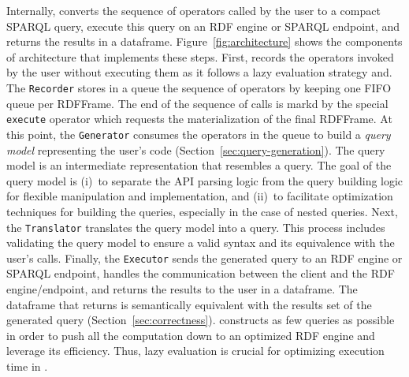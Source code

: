 Internally, \rdfframes  converts the sequence of operators called by the user to a compact SPARQL query, execute this query on an RDF engine or SPARQL endpoint, and returns the results in a dataframe. Figure~\ref{fig:architecture} shows the components of \rdfframes architecture that implements these steps. First, \rdfframes records the operators invoked by the user without executing them as it follows a lazy evaluation strategy and. The \texttt{Recorder} stores in a queue the sequence of operators by keeping one FIFO queue per RDFFrame. %
The end of the sequence of calls is markd by the special \rdfframes \texttt{execute} operator which requests the materialization of the final RDFFrame. 
At this point, the \texttt{Generator} consumes the operators in the queue to build a {\em query model} representing the user's code (Section~\ref{sec:query-generation}).
The query model is an intermediate representation that resembles a \sparql query. The goal of the query model is (i)~to separate the API parsing logic from the query building logic for flexible manipulation and implementation, and (ii)~to facilitate optimization techniques for building the queries, especially in the case of nested queries. Next, the \texttt{Translator} translates the query model into a \sparql query. This process includes validating the query model to ensure a valid \sparql syntax and its equivalence with the user's calls. Finally, the \texttt{Executor} sends the generated \sparql query to an RDF engine or SPARQL endpoint, handles the communication between the client and the RDF engine/endpoint, and returns the results to the user in a dataframe. The dataframe that \rdfframes returns is semantically equivalent with the results set of the generated \sparql query (Section~\ref{sec:correctness}). \rdfframes constructs as few \sparql queries as possible in order to push all the computation down to an optimized RDF engine and leverage its efficiency. Thus, lazy evaluation is crucial for optimizing execution time in \rdfframes. 


